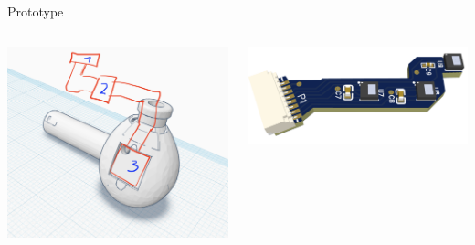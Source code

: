 \documentclass[en]{sdqbeamer}
\begin{document}
\begin{frame}{Prototype}
\begin{columns}[T] %
    \begin{column}{.48\textwidth} %
      \includegraphics[width=0.9\linewidth]{../thesis-doc/images/prototype/flex_pcb_design_finding.png} %
    \end{column}

    \begin{column}{.48\textwidth} %
      \includegraphics[width=1.05\linewidth]{../thesis-doc/images/prototype/pcb/flex_pcb_3D.png} %
    \end{column}
  \end{columns}
    
\end{frame}
\end{document}

